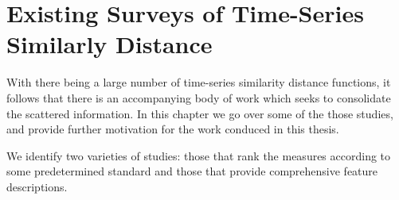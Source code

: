 \chapter{Existing Surveys of Time-Series  Similarly Distance }
\label{ch:4}

With there being a large number of time-series similarity distance functions, it follows that there is an accompanying body of work which seeks to consolidate the scattered information.
In this chapter we go over some of the those studies, and provide further motivation for the work conduced in this thesis. 

We identify two varieties of studies: those that rank the measures according to some predetermined standard and those that provide comprehensive feature descriptions. 







